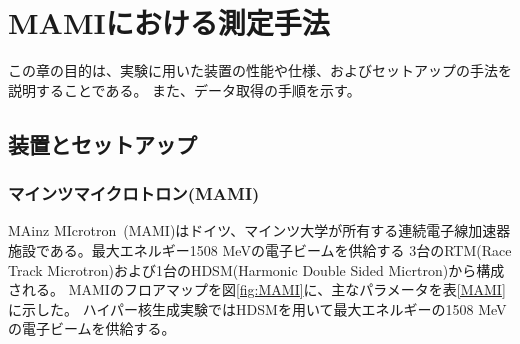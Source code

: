 \documentclass[a4paper,11pt,uplatex]{jsbook}
\begin{document}
\chapter{MAMIにおける測定手法}
この章の目的は、実験に用いた装置の性能や仕様、およびセットアップの手法を説明することである。
また、データ取得の手順を示す。
\section{装置とセットアップ}
\subsection{マインツマイクロトロン(MAMI)}
MAinz MIcrotron~(MAMI)はドイツ、マインツ大学が所有する連続電子線加速器施設である。最大エネルギー1508 MeVの電子ビームを供給する
3台のRTM(Race Track Microtron)および1台のHDSM(Harmonic Double Sided Micrtron)から構成される。
MAMIのフロアマップを図\ref{fig:MAMI}に、主なパラメータを表\ref{MAMI}に示した。
ハイパー核生成実験ではHDSMを用いて最大エネルギーの1508 MeVの電子ビームを供給する。
\end{document}
